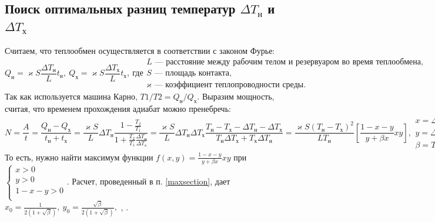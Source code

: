 \documentclass[a4paper]{article}
\begin{document}
\subsection{Поиск оптимальных разниц температур $\Delta T_\text{н}$ и $\Delta T_\text{х}$}
Считаем, что теплообмен осуществляется в соответствии с законом Фурье:
$$
Q_\text{н}=\varkappa S\frac{\Delta T_{\text{н}}}{L}t_{\text{н}},\ 
Q_\text{х}=\varkappa S\frac{\Delta T_{\text{х}}}{L}t_{\text{х}},\ 
\text{где}
\begin{array}{l}
L\text{~--- расстояние между рабочим телом и резервуаром во время теплообмена},\\
S\text{~--- площадь контакта},\\
\varkappa\text{~--- коэффициент теплопроводности среды.}
\end{array}
$$
Так как используется машина Карно,
$T1/T2=Q_{\text{н}}/Q_{\text{х}}$.\newline
Выразим мощность, считая, что временем прохождения адиабат можно пренебречь:
$$
N=\frac{A}{t}=\frac{Q_\text{н}-Q_\text{х}}{t_{\text{н}}+t_{\text{х}}}=
\frac{\varkappa S}{L}\Delta T_{\text{н}}\frac{1-\frac{T_2}{T_1}}{1+\frac{T_2}{T_1}\frac{\Delta T_{\text{н}}}{\Delta T_{\text{х}}}}=
\frac{\varkappa S}{L}\Delta T_{\text{н}}\Delta T_{\text{х}}\frac{T_{\text{н}}-T_{\text{х}}-\Delta T_{\text{н}}-\Delta T_{\text{х}}}{T_{\text{н}}\Delta T_{\text{х}}+T_{\text{х}}\Delta T_{\text{н}}}=
\frac{\varkappa S(T_{\text{н}}-T_{\text{х}})^2}{LT_{\text{н}}}\left[\frac{1-x-y}{y+\beta x}xy\right],
\begin{array}{lcr}
x=\Delta T_{\text{н}}/(T_{\text{н}}-T_{\text{х}}),\\
y=\Delta T_{\text{х}}/(T_{\text{н}}-T_{\text{х}}),\\
\beta= T_{\text{х}}/T_{\text{н}}.
\end{array}
$$
То есть, нужно найти максимум функции $f(x,y)=\frac{1-x-y}{y+\beta x}xy$ при $
\left\{
\begin{array}{l}
x>0\\
y>0\\
1-x-y>0\\
\end{array}	
\right.
.
$\newline
Расчет, проведенный в п. \ref{maxsection}, дает
$x_0=\frac{1}{2(1+\sqrt{\beta})},\ y_0=\frac{\sqrt{\beta}}{2(1+\sqrt{\beta})},$\newline
{\Large{},
\fbox{$N^{max}=\frac{\varkappa S}{4L}(\sqrt{T_{\text{н}}}-\sqrt{T_{\text{х}}})^2$}.}
\newpage
\end{document}
